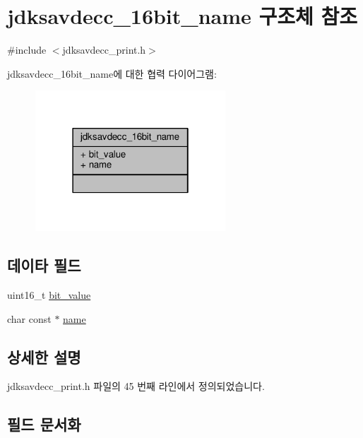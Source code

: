 \hypertarget{structjdksavdecc__16bit__name}{}\section{jdksavdecc\+\_\+16bit\+\_\+name 구조체 참조}
\label{structjdksavdecc__16bit__name}


{\ttfamily \#include $<$jdksavdecc\+\_\+print.\+h$>$}



jdksavdecc\+\_\+16bit\+\_\+name에 대한 협력 다이어그램\+:
\nopagebreak
\begin{figure}[H]
\begin{center}
\leavevmode
\includegraphics[width=202pt]{structjdksavdecc__16bit__name__coll__graph}
\end{center}
\end{figure}
\subsection*{데이타 필드}
\begin{DoxyCompactItemize}
\item 
uint16\+\_\+t \hyperlink{structjdksavdecc__16bit__name_ab84f0fb74ca7d1faeddf2c11cb72d037}{bit\+\_\+value}
\item 
char const $\ast$ \hyperlink{structjdksavdecc__16bit__name_a5f1de76dd5d451949e12c0fbc966ca70}{name}
\end{DoxyCompactItemize}


\subsection{상세한 설명}


jdksavdecc\+\_\+print.\+h 파일의 45 번째 라인에서 정의되었습니다.



\subsection{필드 문서화}
